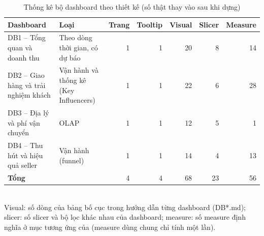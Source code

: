 \begin{table}[htbp]\centering\scriptsize\caption{Thống kê bộ dashboard theo thiết kế (số thật thay vào sau khi dựng)}\label{tab:dash-thong-ke}
\begin{tabular}{p{4.0cm}p{3.6cm}rrrrr}\toprule
\textbf{Dashboard} & \textbf{Loại} & \textbf{Trang} & \textbf{Tooltip} & \textbf{Visual} & \textbf{Slicer} & \textbf{Measure}\\\midrule
DB1 – Tổng quan và doanh thu & Theo dòng thời gian, có dự báo & 1 & 1 & 20 & 8 & 14\\
DB2 – Giao hàng và trải nghiệm khách & Vận hành và thống kê (Key Influencers) & 1 & 1 & 22 & 6 & 28\\
DB3 – Địa lý và phí vận chuyển & OLAP & 1 & 1 & 12 & 5 & 1\\
DB4 – Thu hút và hiệu quả seller & Vận hành (funnel) & 1 & 1 & 14 & 4 & 13\\
\midrule
\textbf{Tổng} & & 4 & 4 & 68 & 23 & 56\\
\bottomrule\end{tabular}\\[2pt]{\footnotesize Visual: số dòng của bảng bố cục trong hướng dẫn từng dashboard (DB*.md); slicer: số slicer và bộ lọc khác nhau của dashboard; measure: số measure định nghĩa ở mục tương ứng của  (measure dùng chung chỉ tính một lần).}
\end{table}
